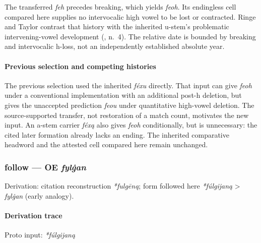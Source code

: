 \documentclass[
  british,
  a4paper,
]{article}
\begin{document}
The transferred \emph{feh} precedes breaking, which yields \emph{feoh}.
Its endingless cell compared here supplies no intervocalic high vowel to
be lost or contracted. Ringe and Taylor contrast that history with the
inherited u-stem's problematic intervening-vowel development
(, n.~4). The
relative date is bounded by breaking and intervocalic h-loss, not an
independently established absolute year.

\paragraph{Previous selection and competing
histories}\label{previous-selection-and-competing-histories}

The previous selection used the inherited \emph{féxu} directly. That
input can give \emph{feoh} under a conventional implementation with an
additional post-h deletion, but gives the unaccepted prediction
\emph{feou} under quantitative high-vowel deletion. The source-supported
transfer, not restoration of a match count, motivates the new input. An
a-stem carrier \emph{féxą} also gives \emph{feoh} conditionally, but is
unnecessary: the cited later formation already lacks an ending. The
inherited comparative headword and the attested cell compared here
remain unchanged.

\subsubsection{\texorpdfstring{follow --- OE
\emph{fylġan}}{follow --- OE fylġan}}\label{follow-oe-fylux121an}

Derivation: citation reconstruction \emph{*fulgēną}; form followed here
\emph{*fúlgijaną} \textgreater{} \emph{fylġan} (early analogy).

\paragraph{Derivation trace}\label{derivation-trace-118}

Proto input: \emph{*fúlgijaną}

\begingroup
\setlength{\fboxsep}{6pt}
\end{document}
